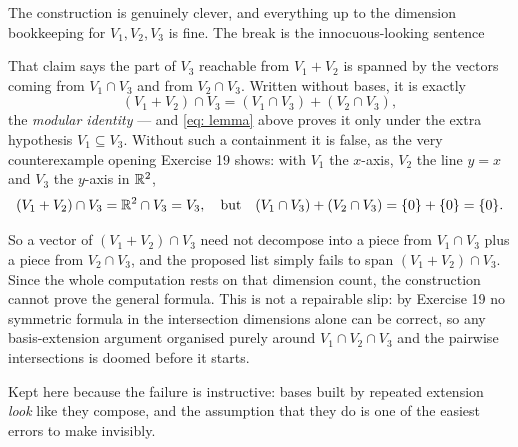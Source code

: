 \begin{ainote}
  The construction is genuinely clever, and everything up to the dimension bookkeeping for $V_1, V_2, V_3$ is fine. The break is the innocuous-looking sentence 

  That claim says the part of $V_3$ reachable from $V_1 + V_2$ is spanned by the vectors coming from $V_1 \cap V_3$ and from $V_2 \cap V_3$. Written without bases, it is exactly
  \begin{equation}
    (V_1+V_2) \cap V_3 = (V_1 \cap V_3) + (V_2 \cap V_3),
  \end{equation}
  the \emph{modular identity} --- and \eqref{eq: lemma} above proves it only under the extra hypothesis $V_1 \subseteq V_3$. Without such a containment it is false, as the very counterexample opening Exercise 19 shows: with $V_1$ the $x$-axis, $V_2$ the line $y=x$ and $V_3$ the $y$-axis in $\mathbb{R}^2$,
  \begin{equation}
    (V_1 + V_2) \cap V_3 = \mathbb{R}^2 \cap V_3 = V_3, \quad \text{but} \quad (V_1 \cap V_3) + (V_2 \cap V_3) = \{0\} + \{0\} = \{0\}.
  \end{equation}

  So a vector of $(V_1+V_2) \cap V_3$ need not decompose into a piece from $V_1 \cap V_3$ plus a piece from $V_2 \cap V_3$, and the proposed list simply fails to span $(V_1+V_2) \cap V_3$. Since the whole computation rests on that dimension count, the construction cannot prove the general formula. This is not a repairable slip: by Exercise 19 no symmetric formula in the intersection dimensions alone can be correct, so any basis-extension argument organised purely around $V_1 \cap V_2 \cap V_3$ and the pairwise intersections is doomed before it starts.

  Kept here because the failure is instructive: bases built by repeated extension \emph{look} like they compose, and the assumption that they do is one of the easiest errors to make invisibly.
\end{ainote}

